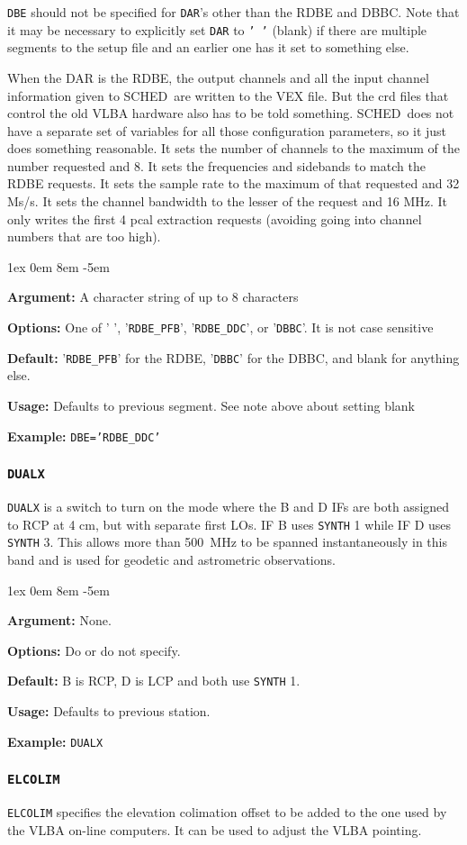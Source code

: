 \documentclass{report}
\newcommand{\schedb}{{\sc SCHED~}}
\newcommand{\rcwbox}[5]{
  \begin{list}{}{\parsep 1ex  \itemsep 0em
                 \leftmargin 8em  \itemindent -5em }
    \item {\bf Argument:} #1
    \item {\bf Options:}  #2
    \item {\bf Default:}  #3
    \item {\bf Usage:}    #4
    \item {\bf Example:}  #5
  \end{list}
}
\begin{document}
{\tt DBE} should not be specified for {\tt DAR}'s other than the RDBE
and DBBC.  Note that it may be necessary to explicitly set {\tt DAR}
to {\tt ' '} (blank) if there are multiple segments to the setup file
and an earlier one has it set to something else.

When the DAR is the RDBE, the output channels and all the input channel
information given to \schedb are written to the VEX file.  But the crd
files that control the old VLBA hardware also has to be told something.
\schedb does not have a separate set of variables for all those configuration
parameters, so it just does something reasonable.  It sets the number of
channels to the maximum of the number requested and 8.  It sets the
frequencies and sidebands to match the RDBE requests.  It sets the
sample rate to the maximum of that requested and 32 Ms/s.  It sets the
channel bandwidth to the lesser of the request and 16 MHz.  It only
writes the first 4 pcal extraction requests (avoiding going into
channel numbers that are too high).

\rcwbox
{A character string of up to 8 characters}
{One of ' ', '{\tt RDBE\_PFB}', '{\tt RDBE\_DDC}', or '{\tt DBBC}'. It
is not case sensitive}
{'{\tt RDBE\_PFB}' for the RDBE, '{\tt DBBC}' for the DBBC, and
blank for anything else.}
{Defaults to previous segment.  See note above about setting blank}
{{\tt DBE='RDBE\_DDC'}}


\subsubsection{\label{SP:DUALX}{\tt DUALX}}

{\tt DUALX} is a switch to turn on the mode where the B and D IFs
are both assigned to RCP at 4 cm, but with separate first LOs. IF B
uses {\tt SYNTH} 1 while IF D uses {\tt SYNTH} 3. This allows more
than 500~MHz to be spanned instantaneously in this band and is used
for geodetic and astrometric observations.

\rcwbox
{None.}
{Do or do not specify.}
{B is RCP, D is LCP and both use {\tt SYNTH} 1.}
{Defaults to previous station.}
{{\tt DUALX}}


\subsubsection{\label{SP:ELCOLIM}{\tt ELCOLIM}}

{\tt ELCOLIM} specifies the elevation colimation offset to be added to
the one used by the VLBA on-line computers.  It can be used to adjust
the VLBA pointing.
\end{document}
